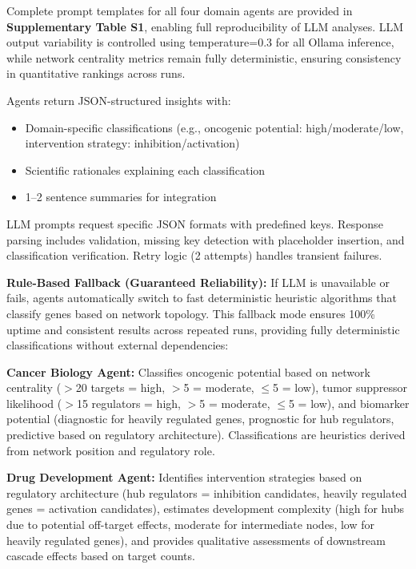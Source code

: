 \documentclass[11pt]{article}
\begin{document}
Complete prompt templates for all four domain agents are provided in \textbf{Supplementary Table S1}, enabling full reproducibility of LLM analyses. LLM output variability is controlled using temperature=0.3 for all Ollama inference, while network centrality metrics remain fully deterministic, ensuring consistency in quantitative rankings across runs.

Agents return JSON-structured insights with:
\begin{itemize}
\item Domain-specific classifications (e.g., oncogenic potential: high/moderate/low, intervention strategy: inhibition/activation)
\item Scientific rationales explaining each classification
\item 1--2 sentence summaries for integration
\end{itemize}

LLM prompts request specific JSON formats with predefined keys. Response parsing includes validation, missing key detection with placeholder insertion, and classification verification. Retry logic (2 attempts) handles transient failures.

\textbf{Rule-Based Fallback (Guaranteed Reliability):}
If LLM is unavailable or fails, agents automatically switch to fast deterministic heuristic algorithms that classify genes based on network topology. This fallback mode ensures 100\% uptime and consistent results across repeated runs, providing fully deterministic classifications without external dependencies:

\textbf{Cancer Biology Agent:} Classifies oncogenic potential based on network centrality ($>$20 targets = high, $>$5 = moderate, $\leq$5 = low), tumor suppressor likelihood ($>$15 regulators = high, $>$5 = moderate, $\leq$5 = low), and biomarker potential (diagnostic for heavily regulated genes, prognostic for hub regulators, predictive based on regulatory architecture). Classifications are heuristics derived from network position and regulatory role.

\textbf{Drug Development Agent:} Identifies intervention strategies based on regulatory architecture (hub regulators = inhibition candidates, heavily regulated genes = activation candidates), estimates development complexity (high for hubs due to potential off-target effects, moderate for intermediate nodes, low for heavily regulated genes), and provides qualitative assessments of downstream cascade effects based on target counts.
\end{document}
